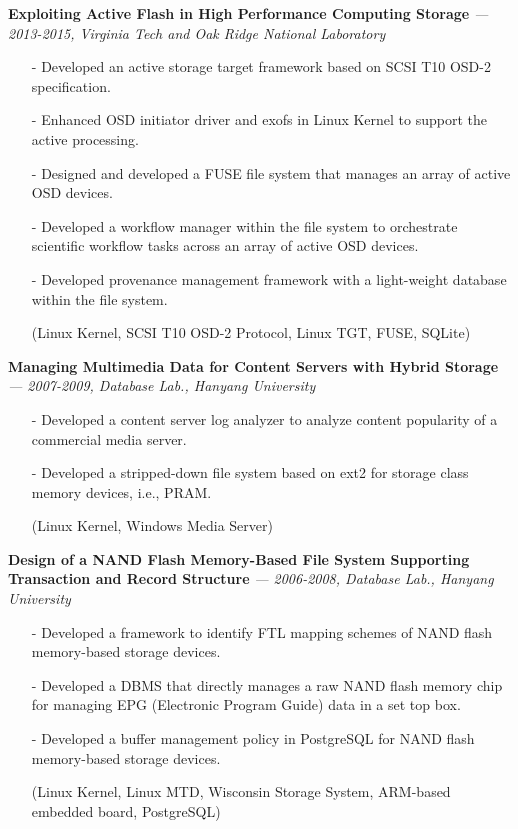   \vspace{-0.15in}
  {\bf Exploiting Active Flash in High Performance Computing Storage}
    {\it \footnotesize --- 2013-2015, Virginia Tech and Oak Ridge National Laboratory}
    \begin{itemize}[leftmargin=*]
    \setlength\itemsep{-0.02in}
    \item[-] Developed an active storage target framework based on SCSI T10 OSD-2
    specification.
    \item[-] Enhanced OSD initiator driver and exofs in Linux Kernel to support the active
    processing.
    \item[-] Designed and developed a FUSE file system that manages an array of active OSD devices.
    \item[-] Developed a workflow manager within the file system to orchestrate scientific
    workflow tasks across an array of active OSD devices.
    \item[-] Developed provenance management framework with a light-weight database
             within the file system.
    \item[] {\small(Linux Kernel, SCSI T10 OSD-2 Protocol, Linux TGT, FUSE, SQLite)}
    \end{itemize}
  \vspace{-0.15in}
  {\bf Managing Multimedia Data for Content Servers with Hybrid Storage}
    {\it \footnotesize --- 2007-2009, Database Lab., Hanyang University}
    \begin{itemize}[leftmargin=*]
    \setlength\itemsep{-0.02in}
    \item[-] Developed a content server log analyzer to analyze content popularity
             of a commercial media server.
    \item[-] Developed a stripped-down file system based on ext2
             for storage class memory devices, i.e., PRAM.
    \item[] {\small(Linux Kernel, Windows Media Server)}
    \end{itemize}
  \vspace{-0.15in}
  {\bf Design of a NAND Flash Memory-Based File System Supporting Transaction and
      Record Structure} 
    {\it \footnotesize --- 2006-2008, Database Lab., Hanyang University}
    \begin{itemize}[leftmargin=*]
    \setlength\itemsep{-0.02in}
    \item[-] Developed a framework to identify FTL mapping schemes of NAND flash memory-based
             storage devices.
    \item[-] Developed a DBMS that directly manages a raw NAND flash memory chip
             for managing EPG (Electronic Program Guide) data in a set top box.
    \item[-] Developed a buffer management policy in PostgreSQL for NAND flash
             memory-based storage devices.
    \item[] {\small(Linux Kernel, Linux MTD, Wisconsin Storage System, ARM-based embedded
     board, PostgreSQL)}
    \end{itemize}
